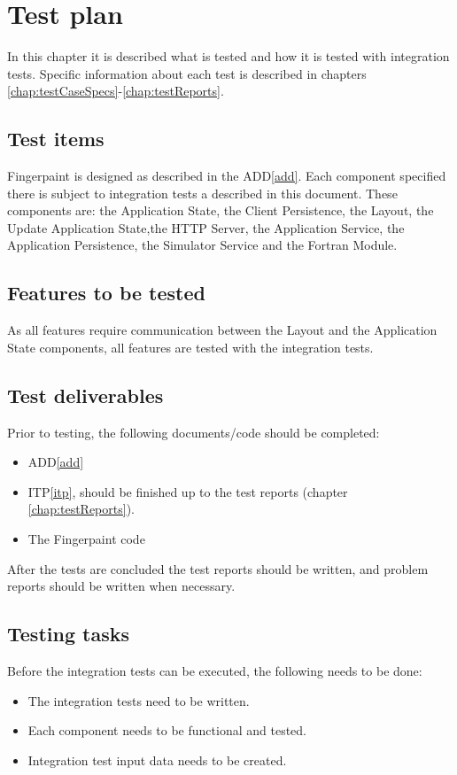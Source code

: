 \chapter{Test plan}
\label{chap:testPlan}
In this chapter it is described what is tested and how it is tested with integration tests. Specific information about each test is described in chapters \ref{chap:testCaseSpecs}-\ref{chap:testReports}.

\section{Test items}
Fingerpaint is designed as described in the ADD\ref{add}. Each component specified there is subject to integration tests a described in this document. These components are: the Application State, the Client Persistence, the Layout, the Update Application State,the HTTP Server, the Application Service, the Application Persistence, the Simulator Service and the Fortran Module.

\section{Features to be tested}
As all features require communication between the Layout and the Application State components, all features are tested with the integration tests.

\section{Test deliverables}
Prior to testing, the following documents/code should be completed:
\begin{itemize}
\item ADD\ref{add}
\item ITP\ref{itp}, should be finished up to the test reports (chapter \ref{chap:testReports}).
\item The Fingerpaint code
\end{itemize}
After the tests are concluded the test reports should be written, and problem reports should be written when necessary.

\section{Testing tasks}
Before the integration tests can be executed, the following needs to be done:
\begin{itemize}
\item The integration tests need to be written.
\item Each component needs to be functional and tested.
\item Integration test input data needs to be created.
\end{itemize}

